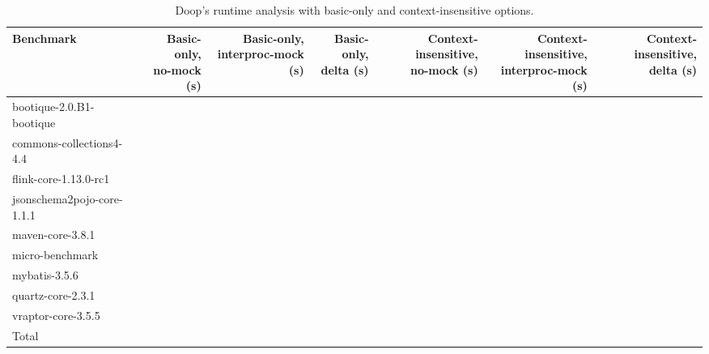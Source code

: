 \begin{table*}
	\centering
	\caption{Doop's runtime analysis with basic-only and context-insensitive options.}
	\begin{tabular}{lrrrrrr}
		\toprule
		Benchmark & \thead{Basic-only, \\ no-mock (s)} & \thead{Basic-only, \\ interproc-mock (s)} & \thead{Basic-only, \\ delta (s)} & \thead{Context-insensitive, \\ no-mock (s)}  & \thead{Context-insensitive, \\ interproc-mock (s)} & \thead{Context-insensitive, \\ delta (s)} \\
		\midrule
		bootique-2.0.B1-bootique           		&    &    &   &   &    &     \\
		commons-collections4-4.4           		&    &    &   &   &    &         \\
		flink-core-1.13.0-rc1           		&    &    &   &   &    &         \\
		jsonschema2pojo-core-1.1.1         		&    &    &   &   &    &        \\
		maven-core-3.8.1   		           		&    &    &   &   &    &         \\
		micro-benchmark         		  		&    & 	  &   &   &    &         \\
		mybatis-3.5.6         		  			&    &    &   &   &    &         \\
		quartz-core-2.3.1        	  			&    &    &   &   &    &       \\
		vraptor-core-3.5.5         	  			&    &    &   &   &    &      \\
		\bottomrule
		Total         	  						&    &    &   &   &    &       \\
	\end{tabular}
	\label{tab:doop-runtimes}
\end{table*}

